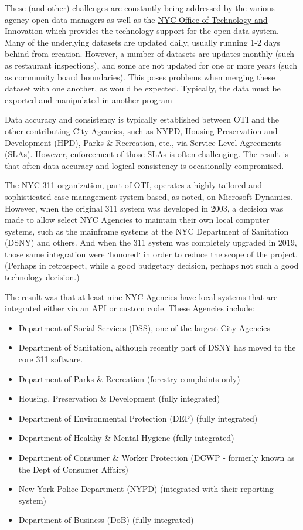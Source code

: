 \documentclass[12pt, titlepage]{article}
\begin{document}
These (and other) challenges are constantly being addressed by the various agency open data managers
as well as the \href{https://www.nyc.gov/content/oti/pages/}{NYC Office of Technology and Innovation} which
provides the technology support for the open data system.  
Many of the underlying datasets are updated daily, usually running 1-2 days behind from creation.
However, a number of datasets are updates monthly (such as restaurant inspections), and some are
not updated for one or more years (such as community board boundaries). This poses problems when 
merging these dataset with one another, as would be expected. Typically, the data must be
exported and manipulated in another program

Data accuracy and consistency is typically established between OTI and the other contributing
City Agencies, such as NYPD, Housing Preservation and Development (HPD), Parks \& Recreation, etc.,
via Service Level Agreements (SLAs). However, enforcement of those SLAs is often challenging. The 
result is that often data accuracy and logical consistency is occasionally compromised.

The NYC 311 organization, part of OTI, operates a highly tailored and sophisticated case
management system based, as noted, on Microsoft Dynamics. However, when the original 311
system was developed in 2003, a decision was made to allow select NYC Agencies to
maintain their own local computer systems, such as the mainframe systems at the NYC Department
of Sanitation (DSNY) and others. And when the 311 system was completely upgraded in 2019, those
same integration were `honored` in order to reduce the scope of the project. (Perhaps in
retrospect, while a good budgetary decision, perhaps not such a good technology decision.)

The result was that at least nine NYC Agencies have local systems that are integrated either via
an API or custom code. These Agencies include:

\begin{itemize}
	\item Department of Social Services (DSS), one of the largest City Agencies
	\item Department of Sanitation, although recently part of DSNY has moved to the core 311 software.
	\item Department of Parks \& Recreation (forestry complaints only)
	\item Housing, Preservation \& Development (fully integrated)
	\item Department of Environmental Protection (DEP) (fully integrated)
	\item Department of Healthy \& Mental Hygiene (fully integrated) 
	\item Department of Consumer \& Worker Protection (DCWP - formerly known as the Dept of Consumer Affairs)
	\item New York Police Department (NYPD) (integrated with their reporting system)
	\item Department of Business (DoB) (fully integrated)
\end{itemize}
\end{document}
